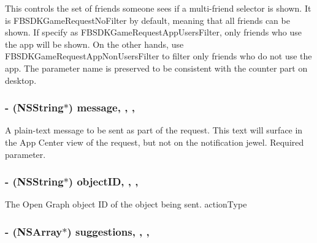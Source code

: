 This controls the set of friends someone sees if a multi-\/friend selector is shown. It is F\-B\-S\-D\-K\-Game\-Request\-No\-Filter by default, meaning that all friends can be shown. If specify as F\-B\-S\-D\-K\-Game\-Request\-App\-Users\-Filter, only friends who use the app will be shown. On the other hands, use F\-B\-S\-D\-K\-Game\-Request\-App\-Non\-Users\-Filter to filter only friends who do not use the app.  The parameter name is preserved to be consistent with the counter part on desktop. \hypertarget{interface_f_b_s_d_k_game_request_content_a88accc7b486e626dae7d08e744a9af66}{
\subsubsection[{message}]{\setlength{\rightskip}{0pt plus 5cm}-\/ (N\-S\-String$\ast$) message\hspace{0.3cm}{\ttfamily [read]}, {\ttfamily [write]}, {\ttfamily [nonatomic]}, {\ttfamily [copy]}}}\label{interface_f_b_s_d_k_game_request_content_a88accc7b486e626dae7d08e744a9af66}
A plain-\/text message to be sent as part of the request. This text will surface in the App Center view of the request, but not on the notification jewel. Required parameter. \hypertarget{interface_f_b_s_d_k_game_request_content_a3ea25b3469e4471f3cde2d36fba75127}{
\subsubsection[{object\-I\-D}]{\setlength{\rightskip}{0pt plus 5cm}-\/ (N\-S\-String$\ast$) object\-I\-D\hspace{0.3cm}{\ttfamily [read]}, {\ttfamily [write]}, {\ttfamily [nonatomic]}, {\ttfamily [copy]}}}\label{interface_f_b_s_d_k_game_request_content_a3ea25b3469e4471f3cde2d36fba75127}
The Open Graph object I\-D of the object being sent.  action\-Type \hypertarget{interface_f_b_s_d_k_game_request_content_affb3cc7aaecddb9dbd1ba01a222e8474}{
\subsubsection[{suggestions}]{\setlength{\rightskip}{0pt plus 5cm}-\/ (N\-S\-Array$\ast$) suggestions\hspace{0.3cm}{\ttfamily [read]}, {\ttfamily [write]}, {\ttfamily [nonatomic]}, {\ttfamily [copy]}}}\label{interface_f_b_s_d_k_game_request_content_affb3cc7aaecddb9dbd1ba01a222e8474}
